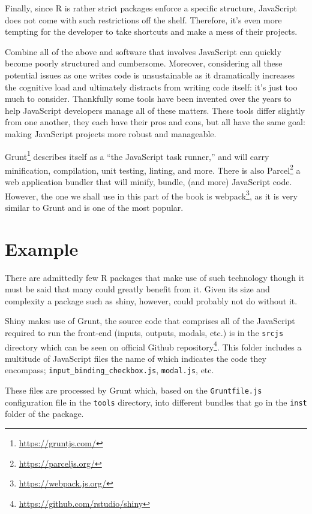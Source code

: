 \documentclass[10pt,]{krantz}
\renewcommand{\href}[2]{#2\footnote{\url{#1}}}
\begin{document}
Finally, since R is rather strict packages enforce a specific structure, JavaScript does not come with such restrictions off the shelf. Therefore, it's even more tempting for the developer to take shortcuts and make a mess of their projects.

Combine all of the above and software that involves JavaScript can quickly become poorly structured and cumbersome. Moreover, considering all these potential issues as one writes code is unsustainable as it dramatically increases the cognitive load and ultimately distracts from writing code itself: it's just too much to consider. Thankfully some tools have been invented over the years to help JavaScript developers manage all of these matters. These tools differ slightly from one another, they each have their pros and cons, but all have the same goal: making JavaScript projects more robust and manageable.

\href{https://gruntjs.com/}{Grunt} describes itself as a ``the JavaScript task runner,'' and will carry minification, compilation, unit testing, linting, and more. There is also \href{https://parceljs.org/}{Parcel} a web application bundler that will minify, bundle, (and more) JavaScript code. However, the one we shall use in this part of the book is \href{https://webpack.js.org/}{webpack}, as it is very similar to Grunt and is one of the most popular.

\hypertarget{webpack-example}{%
\section{Example}\label{webpack-example}}

There are admittedly few R packages that make use of such technology though it must be said that many could greatly benefit from it. Given its size and complexity a package such as shiny, however, could probably not do without it.

Shiny makes use of Grunt, the source code that comprises all of the JavaScript required to run the front-end (inputs, outputs, modals, etc.) is in the \texttt{srcjs} directory which can be seen on \href{https://github.com/rstudio/shiny}{official Github repository}. This folder includes a multitude of JavaScript files the name of which indicates the code they encompass; \texttt{input\_binding\_checkbox.js}, \texttt{modal.js}, etc.

These files are processed by Grunt which, based on the \texttt{Gruntfile.js} configuration file in the \texttt{tools} directory, into different bundles that go in the \texttt{inst} folder of the package.
\end{document}
